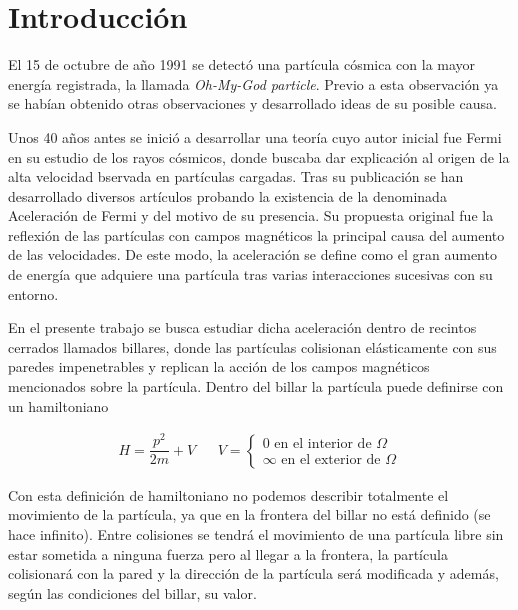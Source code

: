 \documentclass[11pt, spanish]{book}
\begin{document}
\chapter{Introducción}

El 15 de octubre de año 1991 se detectó una partícula cósmica con la mayor energía registrada, la llamada \textit{Oh-My-God particle}\cite{OhMyParticle}. Previo a esta observación ya se habían obtenido otras observaciones y desarrollado ideas de su posible causa.

\vspace{3mm}

Unos 40 años antes se inició a desarrollar una teoría cuyo autor inicial fue Fermi \cite{Fermi} en su estudio de los rayos cósmicos, donde buscaba dar explicación al origen de la alta velocidad bservada en partículas cargadas. Tras su publicación se han desarrollado diversos artículos probando la existencia de la denominada Aceleración de Fermi y del motivo de su presencia. Su propuesta original fue la reflexión de las partículas con campos magnéticos la principal causa del aumento de las velocidades. De este modo, la aceleración se define como el gran aumento de energía que adquiere una partícula tras varias interacciones sucesivas con su entorno. 


En el presente trabajo se busca estudiar dicha aceleración dentro de recintos cerrados llamados billares, donde las partículas colisionan elásticamente con sus paredes impenetrables y replican la acción de los campos magnéticos mencionados sobre la partícula. Dentro del billar la partícula puede definirse con un hamiltoniano

\begin{align}
    H = \dfrac{p^2}{2m} + V & & V = \begin{cases}
        0 \text{ en el interior de } \Omega \\
        \infty \text{ en el exterior de } \Omega
    \end{cases}
\end{align}

\vspace{3mm}

Con esta definición de hamiltoniano no podemos describir totalmente el movimiento de la partícula, ya que en la frontera del billar no está definido (se hace infinito). Entre colisiones se tendrá el movimiento de una partícula libre sin estar sometida a ninguna fuerza pero al llegar a la frontera, la partícula colisionará con la pared y la dirección de la partícula será modificada y además, según las condiciones del billar, su valor. 
\end{document}
